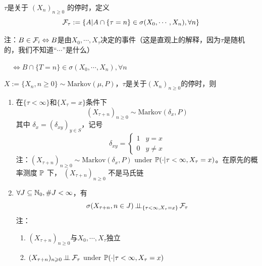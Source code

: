 \begin{definition}[停时$\sigma$代数]
    $\tau$是关于 $(X_n)_{n\geq 0}$ 的停时，定义
    \[
    \mathcal{F}_{\tau}:=\{A|A\cap\{\tau=n\}\in\sigma(X_0,\cdots,X_n),\forall n\}
    \]
\end{definition}

注：$B\in \mathcal{F}_i\Leftrightarrow B$是由$X_0,\cdots,X_{\tau}$决定的事件（这是直观上的解释，因为$\tau$是随机的，我们不知道“$\cdots$”是什么）

$\quad \Leftrightarrow B\cap\{T=n\}\in \sigma(X_0,\cdots,X_n),\forall n$

\begin{proposition}[强马氏性]
    $X:=\{X_n,n\geq 0\}\sim \text{Markov}(\mu,P)$，$\tau$是关于$(X_n)_{n\geq 0}$的停时，则
    \begin{enumerate}
        \item 在$\{\tau<\infty\}$和$\{X_{\tau}=x\}$条件下
        \[
        (X_{\tau+n})_{n\geq 0}\sim\text{Markov}(\delta_x,P)
        \]
        其中 $\delta_x=(\delta_{xy})_{y\in S}$，记号
        \[
        \delta_{xy}=\begin{cases}
            1 & y=x\\
            0 & y\neq x
        \end{cases}
        \]
        注：$(X_{\tau+n})_{n\geq 0}\sim \text{Markov}(\delta_x,P)$ under $\mathbb{P}(\cdot|\tau<\infty,X_{\tau}=x)$。在原先的概率测度 $\mathbb{P}$ 下， $(X_{\tau+n})_{n\geq 0}$ 不是马氏链
        \item $\forall J\subseteq \mathbb{N}_0, \#J<\infty$，有
        \[
        \sigma(X_{\tau+n},n\in J)\operatorname{\perp\!\!\!\perp}_{\{\tau<\infty,X_{\tau}=x\}}\mathcal{F}_{\tau}
        \]
        注：\begin{enumerate}
            \item $(X_{\tau+n})_{n\geq 0}$与$X_0,\cdots,X_{\tau}$独立
            \item $(X_{\tau+n})_{n\geqslant 0}\operatorname{\perp\!\!\!\perp} \mathcal{F}_{\tau}$ under $\mathbb{P}(\cdot|\tau<\infty,X_{\tau}=x)$
        \end{enumerate}
    \end{enumerate}
\end{proposition}


